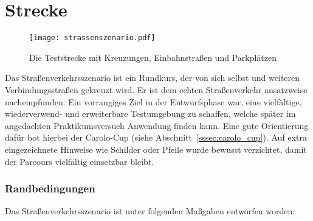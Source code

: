 \section{Strecke \dcfirstauthorshort}

\begin{figure}[htbp] %
  \centering
  \texttt{[image: strassenszenario.pdf]}
  \caption{Die Teststrecke mit Kreuzungen, Einbahnstraßen und Parkplätzen}
  \label{fig:strassenszenario}
\end{figure}
Das Straßenverkehrsszenario ist ein Rundkurs, der von sich selbst und weiteren Verbindungsstraßen gekreuzt wird. Er ist dem echten Straßenverkehr ansatzweise nachempfunden.
Ein vorrangiges Ziel in der Entwurfsphase war, eine vielfältige, wiederverwend- und erweiterbare Testumgebung zu schaffen, welche später im angedachten Praktikumsversuch Anwendung finden kann. Eine gute Orientierung dafür bot hierbei der Carolo-Cup (siehe Abschnitt~\ref{sssec:carolo_cup}). Auf extra eingezeichnete Hinweise wie Schilder oder Pfeile wurde bewusst verzichtet, damit der Parcours vielfältig einsetzbar bleibt.

\subsubsection{Randbedingungen}

Das Straßenverkehrsszenario ist unter folgenden Maßgaben entworfen worden:


